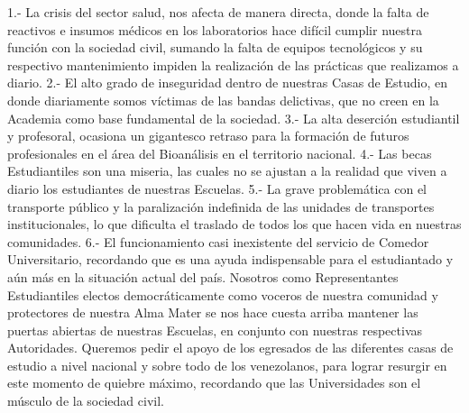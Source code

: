 \documentclass{article}%
\begin{document}
%
1.{-} La crisis del sector salud, nos afecta de manera directa, donde la falta de reactivos e insumos médicos en los laboratorios hace difícil cumplir nuestra función con la sociedad civil, sumando la falta de equipos tecnológicos y su respectivo mantenimiento impiden la realización de las prácticas que realizamos a diario.%
\newline%
%
2.{-} El alto grado de inseguridad dentro de nuestras Casas de Estudio, en donde diariamente somos víctimas de las bandas delictivas, que no creen en la Academia como base fundamental de la sociedad.%
\newline%
%
3.{-} La alta deserción estudiantil y profesoral, ocasiona un gigantesco retraso para la formación de futuros profesionales en el área del Bioanálisis en el territorio nacional.%
\newline%
%
4.{-} Las becas Estudiantiles son una miseria, las cuales no se ajustan a la realidad que viven a diario los estudiantes de nuestras Escuelas.%
\newline%
%
5.{-} La grave problemática con el transporte público y la paralización indefinida de las unidades de transportes institucionales, lo que dificulta el traslado de todos los que hacen vida en nuestras comunidades.%
\newline%
%
6.{-} El funcionamiento casi inexistente del servicio de Comedor Universitario, recordando que es una ayuda indispensable para el estudiantado y aún más en la situación actual del país.%
\newline%
%
Nosotros como Representantes Estudiantiles electos democráticamente como voceros de nuestra comunidad y protectores de nuestra Alma Mater se nos hace cuesta arriba mantener las puertas abiertas de nuestras Escuelas, en conjunto con nuestras respectivas Autoridades.%
\newline%
%
Queremos pedir el apoyo de los egresados de las diferentes casas de estudio a nivel nacional y sobre todo de los venezolanos, para lograr resurgir en este momento de quiebre máximo, recordando que las Universidades son el músculo de la sociedad civil.%
\newline%
%
\end{document}

